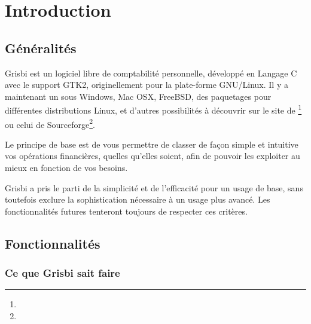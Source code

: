 
\chapter{Introduction\label{introduction}}


\section{Généralités\label{introduction-general}}


Grisbi est un \gls{logiciel libre} de comptabilité personnelle, développé en \gls{Langage C} avec le support \gls{GTK}2, originellement pour la plate-forme \gls{GNU/Linux}. Il y a maintenant un  sous Windows, Mac OSX, FreeBSD, des paquetages pour différentes \gls{distributions Linux}, et d'autres possibilités à découvrir sur le site de \footnote{\urlGrisbi{}} ou celui de {Sourceforge}\footnote{\urlSourceForge{}}.

Le principe de base est de vous permettre de classer de façon simple et intuitive vos opérations financières, quelles qu’elles soient, afin de pouvoir les exploiter au mieux en fonction de vos besoins.

Grisbi a pris le parti de la simplicité et de l'efficacité pour un usage de
base, sans toutefois exclure la sophistication nécessaire à un usage plus avancé. Les fonctionnalités futures tenteront toujours de respecter ces critères.


\section{Fonctionnalités\label{introduction-features}}


\subsection{Ce que Grisbi sait faire}

